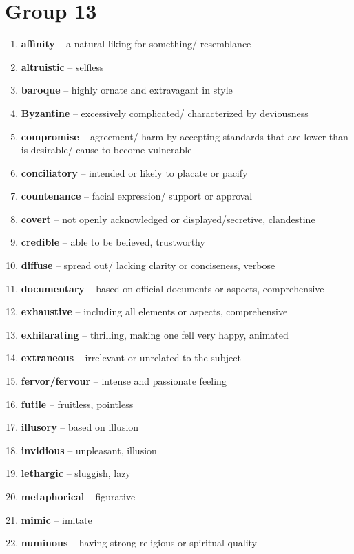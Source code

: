 \newpage
\section{Group 13}

\begin{enumerate}[wide,labelindent=0pt]
\item \textbf{affinity} -- a natural liking for something/ resemblance
\item \textbf{altruistic} -- selfless
\item \textbf{baroque} -- highly ornate and extravagant in style
\item \textbf{Byzantine} -- excessively complicated/ characterized by deviousness
\item \textbf{compromise} -- agreement/ harm by accepting standards that are lower than is desirable/ cause to become vulnerable
\item \textbf{conciliatory} -- intended or likely to placate or pacify
\item \textbf{countenance} -- facial expression/ support or approval
\item \textbf{covert} -- not openly acknowledged or displayed/secretive, clandestine
\item \textbf{credible} -- able to be believed, trustworthy
\item \textbf{diffuse} -- spread out/ lacking clarity or conciseness, verbose
\item \textbf{documentary} -- based on official documents or aspects, comprehensive
\item \textbf{exhaustive} -- including all elements or aspects, comprehensive
\item \textbf{exhilarating} -- thrilling, making one fell very happy, animated
\item \textbf{extraneous} -- irrelevant or unrelated to the subject
\item \textbf{fervor/fervour} -- intense and passionate feeling
\item \textbf{futile} -- fruitless, pointless
\item \textbf{illusory} -- based on illusion
\item \textbf{invidious} -- unpleasant, illusion
\item \textbf{lethargic} -- sluggish, lazy
\item \textbf{metaphorical} -- figurative
\item \textbf{mimic} -- imitate
\item \textbf{numinous} -- having strong religious or spiritual quality

\end{enumerate}
